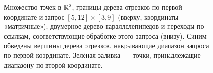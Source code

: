 \documentclass[a4paper,11pt]{article}
\begin{document}
\begin{figure} \centering \vspace{-7mm}
  

  \caption{Множество точек в \(\mathbb R^2\), границы дерева отрезков по первой координате
    и запрос \([5, 12] \times [3, 9]\) (вверху, координаты «матричные»);
    двумерное дерево параллелепипедов и переходы по ссылкам, соответствующие
    обработке этого запроса (внизу). Синим обведены вершины дерева отрезков,
    накрывающие диапазон запроса по первой координате. Зелёная заливка~—
    точки, принадлежащие диапазону по второй координате.}
  \label{fig:range-tikz}
\end{figure}
\end{document}
